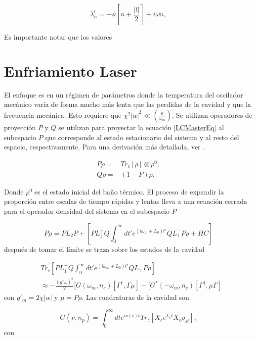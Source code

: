 \documentclass[10pt,a4paper]{report}
\begin{document}
\begin{equation}
\lambda_n^l = -\kappa[n + \frac{|l|}{2}] + i\omega n ,
\end{equation}

Es importante notar que los valores 

\section{Enfriamiento Laser}\label{LasCool}

El enfoque es en un régimen de parámetros donde la temperatura del oscilador mecánico varía de forma mucho más lenta que las perdidas de la cavidad y que la frecuencia mecánica. Esto requiere que $\chi^2 |\alpha|^2 \ll (\frac{\kappa}{\omega_m})$. Se utilizan operadores de proyección $P$ y $Q$ se utilizan para proyectar la ecuación  \eqref{LCMasterEq} al subespacio $P$ que corresponde al estado  estacionario del sistema y al resto del espacio, respectivamente. Para una derivación más detallada, ver \cite{NooshiLC}.

\begin{align}
P\rho=&Tr_c[\rho]\otimes \rho^{0}, \\
Q\rho=&(1-P)\rho.
\end{align}

Donde $\rho^0$ es el estado inicial del baño térmico. El proceso de expandir la proporción entre escalas de tiempo rápidas y
lentas lleva a una ecuación cerrada para el operador densidad del sistema en el subespacio $P$ 


\begin{equation}
P\dot{\rho} = PL_2P + [PL^+_1Q \int_0^\infty dt' e^{(i\omega_m +L_0)t'}QL_1^- P\rho + HC]
\end{equation} después de tomar el límite se traza sobre los estados de la cavidad

\begin{align}
&Tr_c[PL^+_1Q \int_0^\infty dt' e^{(i\omega_m +L_0)t'}QL_1^- P\rho] \\
&\approx -\frac{(g'_m)^2}{2}[G(\omega_m,n_c)[\Gamma^\dagger,\Gamma\mu]-[G^*(-\omega_m,n_c)[\Gamma^\dagger,\mu\Gamma] \nonumber
\end{align} con $g'_m = 2\chi|\alpha|$ y $\mu = P\rho$. Las cuadraturas de la cavidad son

\begin{equation} \label{CavityQuadrature}
G(\nu,n_p) = \int_0^\infty dt e^{i\nu(t) t}Tr_c[X_c e^{L_c t} X_c \rho_{st}],
\end{equation} con 
\end{document}
